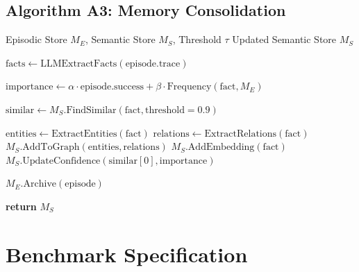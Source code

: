 \documentclass{article}
\theoremstyle{plain}
\theoremstyle{definition}
\theoremstyle{remark}
\begin{document}
\subsection{Algorithm A3: Memory Consolidation}

\begin{algorithm}[H]
	\caption{Unified Memory Consolidation (\uma{})}
	\label{alg:uma_detailed}
	\begin{algorithmic}[1]
		\REQUIRE Episodic Store $M_E$, Semantic Store $M_S$, Threshold $\tau$
		\ENSURE Updated Semantic Store $M_S$
		
		\STATE {}
		\STATE $\text{facts} \leftarrow \text{LLMExtractFacts}(\text{episode.trace})$
		
		\STATE {}
		\STATE $\text{importance} \leftarrow \alpha \cdot \text{episode.success} + \beta \cdot \text{Frequency}(\text{fact}, M_E)$
		
		\STATE {}
		\STATE $\text{similar} \leftarrow M_S.\text{FindSimilar}(\text{fact}, \text{threshold}=0.9)$
		
		\STATE {}
		\STATE $\text{entities} \leftarrow \text{ExtractEntities}(\text{fact})$
		\STATE $\text{relations} \leftarrow \text{ExtractRelations}(\text{fact})$
		\STATE $M_S.\text{AddToGraph}(\text{entities}, \text{relations})$
		\STATE $M_S.\text{AddEmbedding}(\text{fact})$
		\ELSE
		\STATE {}
		\STATE $M_S.\text{UpdateConfidence}(\text{similar}[0], \text{importance})$
		\ENDIF
		\ENDIF
		\ENDFOR
		
		\STATE {}
		\STATE $M_E.\text{Archive}(\text{episode})$
		\ENDFOR
		
		\STATE \textbf{return} $M_S$
	\end{algorithmic}
\end{algorithm}

\section{\mars{} Benchmark Specification}
\label{app:mars}
\end{document}
